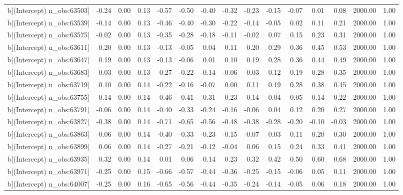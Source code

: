 \begin{table}[ht]
\begin{tabular}{rrrrrrrrrrrrrrr}
  b[(Intercept) n\_obs:63503] & -0.24 & 0.00 & 0.13 & -0.57 & -0.50 & -0.40 & -0.32 & -0.23 & -0.15 & -0.07 & 0.01 & 0.08 & 2000.00 & 1.00 \\ 
  b[(Intercept) n\_obs:63539] & -0.14 & 0.00 & 0.13 & -0.46 & -0.40 & -0.30 & -0.22 & -0.14 & -0.05 & 0.02 & 0.11 & 0.21 & 2000.00 & 1.00 \\ 
  b[(Intercept) n\_obs:63575] & -0.02 & 0.00 & 0.13 & -0.35 & -0.28 & -0.18 & -0.11 & -0.02 & 0.07 & 0.15 & 0.23 & 0.31 & 2000.00 & 1.00 \\ 
  b[(Intercept) n\_obs:63611] & 0.20 & 0.00 & 0.13 & -0.13 & -0.05 & 0.04 & 0.11 & 0.20 & 0.29 & 0.36 & 0.45 & 0.53 & 2000.00 & 1.00 \\ 
  b[(Intercept) n\_obs:63647] & 0.19 & 0.00 & 0.13 & -0.13 & -0.06 & 0.01 & 0.10 & 0.19 & 0.28 & 0.36 & 0.44 & 0.49 & 2000.00 & 1.00 \\ 
  b[(Intercept) n\_obs:63683] & 0.03 & 0.00 & 0.13 & -0.27 & -0.22 & -0.14 & -0.06 & 0.03 & 0.12 & 0.19 & 0.28 & 0.35 & 2000.00 & 1.00 \\ 
  b[(Intercept) n\_obs:63719] & 0.10 & 0.00 & 0.14 & -0.22 & -0.16 & -0.07 & 0.00 & 0.11 & 0.19 & 0.28 & 0.38 & 0.45 & 2000.00 & 1.00 \\ 
  b[(Intercept) n\_obs:63755] & -0.14 & 0.00 & 0.14 & -0.46 & -0.41 & -0.31 & -0.23 & -0.14 & -0.04 & 0.05 & 0.14 & 0.22 & 2000.00 & 1.00 \\ 
  b[(Intercept) n\_obs:63791] & -0.06 & 0.00 & 0.14 & -0.40 & -0.33 & -0.24 & -0.16 & -0.06 & 0.04 & 0.12 & 0.20 & 0.27 & 2000.00 & 1.00 \\ 
  b[(Intercept) n\_obs:63827] & -0.38 & 0.00 & 0.14 & -0.71 & -0.65 & -0.56 & -0.48 & -0.38 & -0.28 & -0.20 & -0.10 & -0.03 & 2000.00 & 1.00 \\ 
  b[(Intercept) n\_obs:63863] & -0.06 & 0.00 & 0.14 & -0.40 & -0.33 & -0.23 & -0.15 & -0.07 & 0.03 & 0.11 & 0.20 & 0.30 & 2000.00 & 1.00 \\ 
  b[(Intercept) n\_obs:63899] & 0.06 & 0.00 & 0.14 & -0.27 & -0.21 & -0.12 & -0.04 & 0.06 & 0.15 & 0.24 & 0.33 & 0.41 & 2000.00 & 1.00 \\ 
  b[(Intercept) n\_obs:63935] & 0.32 & 0.00 & 0.14 & 0.01 & 0.06 & 0.14 & 0.23 & 0.32 & 0.42 & 0.50 & 0.60 & 0.68 & 2000.00 & 1.00 \\ 
  b[(Intercept) n\_obs:63971] & -0.25 & 0.00 & 0.15 & -0.66 & -0.57 & -0.44 & -0.36 & -0.25 & -0.15 & -0.06 & 0.05 & 0.11 & 2000.00 & 1.00 \\ 
  b[(Intercept) n\_obs:64007] & -0.25 & 0.00 & 0.16 & -0.65 & -0.56 & -0.44 & -0.35 & -0.24 & -0.14 & -0.05 & 0.06 & 0.18 & 2000.00 & 1.00 \\ 

\end{tabular}
\end{table}
